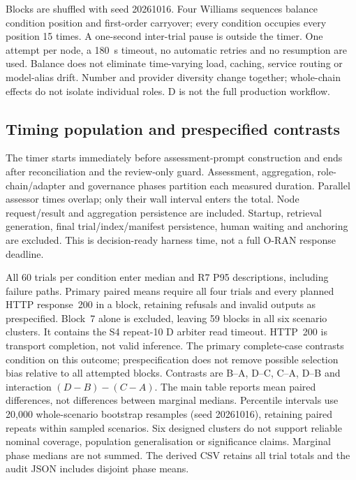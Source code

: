 \begin{revision}
Blocks are shuffled with seed 20261016. Four Williams sequences balance
condition position and first-order carryover; every condition occupies every
position 15 times. A one-second inter-trial pause is outside the timer.
One attempt per node, a 180~s timeout, no automatic retries and no resumption
are used. Balance does not eliminate time-varying load, caching, service
routing or model-alias drift. Number and provider diversity change together;
whole-chain effects do not isolate individual roles. D is not the full
production workflow.

\subsection{Timing population and prespecified contrasts}
The timer starts immediately before assessment-prompt construction and ends
after reconciliation and the review-only guard. Assessment, aggregation,
role-chain/adapter and governance phases partition each measured duration.
Parallel assessor times overlap; only their wall interval enters the total.
Node request/result and aggregation persistence are included. Startup,
retrieval generation, final trial/index/manifest persistence, human waiting
and anchoring are excluded. This is decision-ready harness time, not a full
O-RAN response deadline.

All 60 trials per condition enter median and R7 P95 descriptions, including
failure paths. Primary paired means require all four trials and every
planned HTTP response~200 in a block, retaining refusals and invalid
outputs as prespecified. Block~7 alone is excluded, leaving 59 blocks in
all six scenario clusters. It contains the S4 repeat-10 D arbiter read
timeout. HTTP~200 is transport completion, not valid inference. The primary
complete-case contrasts condition on this outcome; prespecification does
not remove possible selection bias relative to all attempted blocks.
Contrasts are B--A, D--C, C--A, D--B and interaction
$(D-B)-(C-A)$. The main table reports mean paired differences, not
differences between marginal medians. Percentile intervals use 20,000
whole-scenario bootstrap resamples (seed 20261016), retaining paired repeats
within sampled scenarios. Six designed clusters do not support reliable
nominal coverage, population generalisation or significance claims.
Marginal phase medians are not summed. The derived CSV retains all trial
totals and the audit JSON includes disjoint phase means.


\end{revision}
